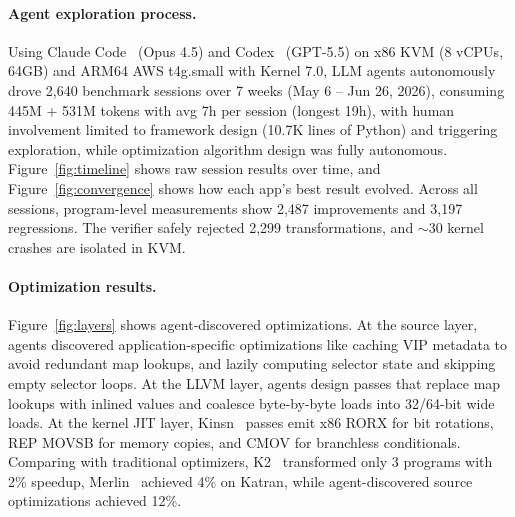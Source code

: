 \documentclass[sigplan,10pt,anonymous,nonacm]{acmart}
\begin{document}
\paragraph{Agent exploration process.}
Using Claude Code~\cite{claudecode2025} (Opus 4.5) and Codex~\cite{openaicodex2025} (GPT-5.5) on x86 KVM (8 vCPUs, 64GB) and ARM64 AWS t4g.small with Kernel 7.0, LLM agents autonomously drove 2,640 benchmark sessions over 7 weeks (May 6 -- Jun 26, 2026), consuming 445M + 531M tokens with avg 7h per session (longest 19h), with human involvement limited to framework design (10.7K lines of Python) and triggering exploration, while optimization algorithm design was fully autonomous.
Figure~\ref{fig:timeline} shows raw session results over time, and Figure~\ref{fig:convergence} shows how each app's best result evolved.
Across all sessions, program-level measurements show 2,487 improvements and 3,197 regressions. The verifier safely rejected 2,299 transformations, and $\sim$30 kernel crashes are isolated in KVM.

\paragraph{Optimization results.}
Figure~\ref{fig:layers} shows agent-discovered optimizations.
At the source layer, agents discovered application-specific optimizations like caching VIP metadata to avoid redundant map lookups, and lazily computing selector state and skipping empty selector loops.
At the LLVM layer, agents design passes that replace map lookups with inlined values and coalesce byte-by-byte loads into 32/64-bit wide loads.
At the kernel JIT layer, Kinsn~\cite{kinsn2026} passes emit x86 RORX for bit rotations, REP MOVSB for memory copies, and CMOV for branchless conditionals.
Comparing with traditional optimizers, K2~\cite{xu2021synthesizing} transformed only 3 programs with 2\% speedup, Merlin~\cite{mao2024merlin} achieved 4\% on Katran, while agent-discovered source optimizations achieved 12\%.
\end{document}

